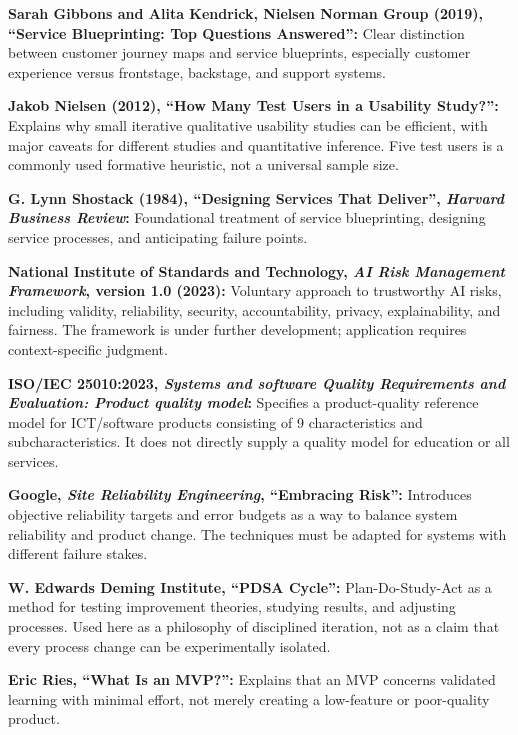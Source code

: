 \begin{enumerate}[leftmargin=*, label={[\textbf{R\arabic*}]}]
\item \textbf{Sarah Gibbons and Alita Kendrick, Nielsen Norman Group (2019), ``Service Blueprinting: Top Questions Answered'':} Clear distinction between customer journey maps and service blueprints, especially customer experience versus frontstage, backstage, and support systems.

\item \textbf{Jakob Nielsen (2012), ``How Many Test Users in a Usability Study?'':} Explains why small iterative qualitative usability studies can be efficient, with major caveats for different studies and quantitative inference. Five test users is a commonly used formative heuristic, not a universal sample size.

\item \textbf{G. Lynn Shostack (1984), ``Designing Services That Deliver'', \emph{Harvard Business Review}:} Foundational treatment of service blueprinting, designing service processes, and anticipating failure points.

\item \textbf{National Institute of Standards and Technology, \emph{AI Risk Management Framework}, version 1.0 (2023):} Voluntary approach to trustworthy AI risks, including validity, reliability, security, accountability, privacy, explainability, and fairness. The framework is under further development; application requires context-specific judgment.

\item \textbf{ISO/IEC 25010:2023, \emph{Systems and software Quality Requirements and Evaluation: Product quality model}:} Specifies a product-quality reference model for ICT/software products consisting of 9 characteristics and subcharacteristics. It does not directly supply a quality model for education or all services.

\item \textbf{Google, \emph{Site Reliability Engineering}, ``Embracing Risk'':} Introduces objective reliability targets and error budgets as a way to balance system reliability and product change. The techniques must be adapted for systems with different failure stakes.

\item \textbf{W. Edwards Deming Institute, ``PDSA Cycle'':} Plan-Do-Study-Act as a method for testing improvement theories, studying results, and adjusting processes. Used here as a philosophy of disciplined iteration, not as a claim that every process change can be experimentally isolated.

\item \textbf{Eric Ries, ``What Is an MVP?'':} Explains that an MVP concerns validated learning with minimal effort, not merely creating a low-feature or poor-quality product.
\end{enumerate}

